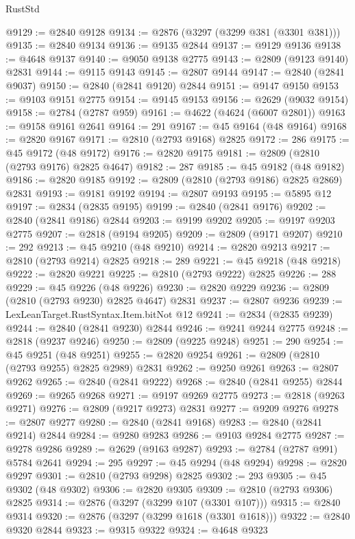 \begin{lexlean}{RustStd}
\begin{coremodule}
@9129 := @2840 @9128
@9134 := @2876 (@3297 (@3299 @381 (@3301 @381)))
@9135 := @2840 @9134
@9136 := @9135 @2844
@9137 := @9129 @9136
@9138 := @4648 @9137
@9140 := @9050 @9138 @2775
@9143 := @2809 (@9123 @9140) @2831
@9144 := @9115 @9143
@9145 := @2807 @9144
@9147 := @2840 (@2841 @9037)
@9150 := @2840 (@2841 @9120) @2844
@9151 := @9147 @9150
@9153 := @9103 @9151 @2775
@9154 := @9145 @9153
@9156 := @2629 (@9032 @9154)
@9158 := @2784 (@2787 @959)
@9161 := @4622 (@4624 (@6007 @2801))
@9163 := @9158 @9161 @2641
@9164 := 291
@9167 := @45 @9164 (@48 @9164)
@9168 := @2820 @9167
@9171 := @2810 (@2793 @9168) @2825
@9172 := 286
@9175 := @45 @9172 (@48 @9172)
@9176 := @2820 @9175
@9181 := @2809 (@2810 (@2793 @9176) @2825 @4647)
@9182 := 287
@9185 := @45 @9182 (@48 @9182)
@9186 := @2820 @9185
@9192 := @2809 (@2810 (@2793 @9186) @2825 @2869) @2831
@9193 := @9181 @9192
@9194 := @2807 @9193
@9195 := @5895 @12
@9197 := @2834 (@2835 @9195)
@9199 := @2840 (@2841 @9176)
@9202 := @2840 (@2841 @9186) @2844
@9203 := @9199 @9202
@9205 := @9197 @9203 @2775
@9207 := @2818 (@9194 @9205)
@9209 := @2809 (@9171 @9207)
@9210 := 292
@9213 := @45 @9210 (@48 @9210)
@9214 := @2820 @9213
@9217 := @2810 (@2793 @9214) @2825
@9218 := 289
@9221 := @45 @9218 (@48 @9218)
@9222 := @2820 @9221
@9225 := @2810 (@2793 @9222) @2825
@9226 := 288
@9229 := @45 @9226 (@48 @9226)
@9230 := @2820 @9229
@9236 := @2809 (@2810 (@2793 @9230) @2825 @4647) @2831
@9237 := @2807 @9236
@9239 := LexLeanTarget.RustSyntax.Item.bitNot @12
@9241 := @2834 (@2835 @9239)
@9244 := @2840 (@2841 @9230) @2844
@9246 := @9241 @9244 @2775
@9248 := @2818 (@9237 @9246)
@9250 := @2809 (@9225 @9248)
@9251 := 290
@9254 := @45 @9251 (@48 @9251)
@9255 := @2820 @9254
@9261 := @2809 (@2810 (@2793 @9255) @2825 @2989) @2831
@9262 := @9250 @9261
@9263 := @2807 @9262
@9265 := @2840 (@2841 @9222)
@9268 := @2840 (@2841 @9255) @2844
@9269 := @9265 @9268
@9271 := @9197 @9269 @2775
@9273 := @2818 (@9263 @9271)
@9276 := @2809 (@9217 @9273) @2831
@9277 := @9209 @9276
@9278 := @2807 @9277
@9280 := @2840 (@2841 @9168)
@9283 := @2840 (@2841 @9214) @2844
@9284 := @9280 @9283
@9286 := @9103 @9284 @2775
@9287 := @9278 @9286
@9289 := @2629 (@9163 @9287)
@9293 := @2784 (@2787 @991) @5784 @2641
@9294 := 295
@9297 := @45 @9294 (@48 @9294)
@9298 := @2820 @9297
@9301 := @2810 (@2793 @9298) @2825
@9302 := 293
@9305 := @45 @9302 (@48 @9302)
@9306 := @2820 @9305
@9309 := @2810 (@2793 @9306) @2825
@9314 := @2876 (@3297 (@3299 @107 (@3301 @107)))
@9315 := @2840 @9314
@9320 := @2876 (@3297 (@3299 @1618 (@3301 @1618)))
@9322 := @2840 @9320 @2844
@9323 := @9315 @9322
@9324 := @4648 @9323

\end{coremodule}
\end{lexlean}
